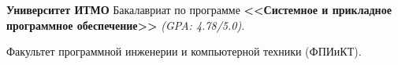 
\vspace{0.8em}
\begin{scholarship}
     {\textbf {Университет ИТМО} \newline
     Бакалавриат по программе \textbf {<<Системное и прикладное программное обеспечение>>} \textit{(GPA: 4.78/5.0)}.

     Факультет программной инженерии и компьютерной техники (ФПИиКТ).}
\end{scholarship}
